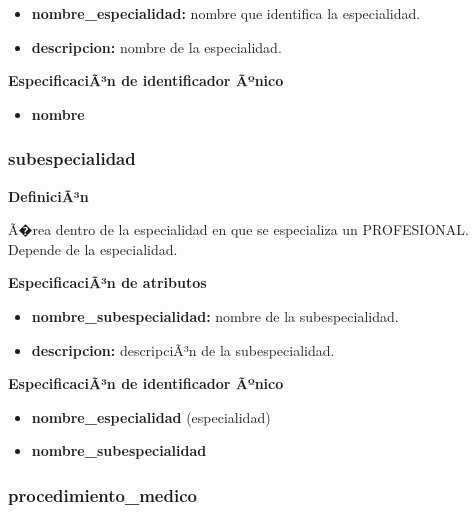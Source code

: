 \documentclass[a4paper,11pt]{article}
\begin{document}
\begin{itemize}

     \item \textbf{nombre\_especialidad:} nombre que identifica la especialidad.

     \item \textbf{descripcion:} nombre de la especialidad.

\end{itemize}

\textbf{EspecificaciÃ³n de identificador Ãºnico}

\begin{itemize}

     \item \textbf{nombre}

\end{itemize}

\subsubsection{\textbf{subespecialidad}}

\textbf{DefiniciÃ³n}

Ã�rea dentro de la especialidad en que se especializa un PROFESIONAL. Depende de 
la especialidad.

\textbf{EspecificaciÃ³n de atributos}

\begin{itemize}

     \item \textbf{nombre\_subespecialidad:} nombre de la subespecialidad.

     \item \textbf{descripcion:} descripciÃ³n de la subespecialidad.

\end{itemize}

\textbf{EspecificaciÃ³n de identificador Ãºnico}

\begin{itemize}

     \item \textbf{nombre\_especialidad} (especialidad)

     \item \textbf{nombre\_subespecialidad}

\end{itemize}

\subsubsection{\textbf{procedimiento\_medico}}
\end{document}
